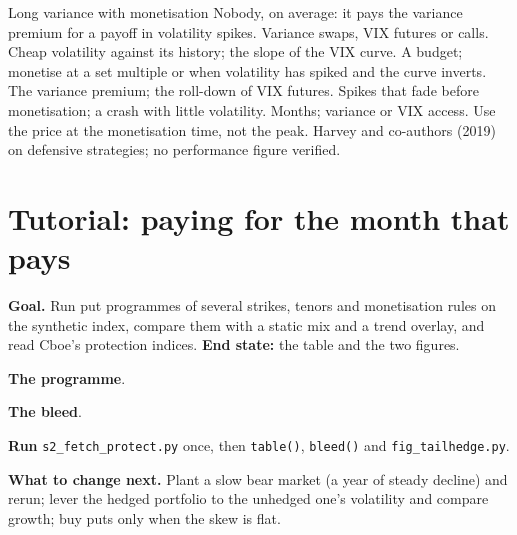 \begin{strategyfile}{Long variance with monetisation}\label{strat:s2:tail-hedging-and-long-volatility:variance}
 Nobody, on average: it pays the variance premium for a payoff in volatility spikes.
 Variance swaps, VIX futures or calls.
 Cheap volatility against its history; the slope of the VIX curve.
 A budget; monetise at a set multiple or when volatility has spiked and the curve inverts.
 The variance premium; the roll-down of VIX futures.
 Spikes that fade before monetisation; a crash with little volatility.
 Months; variance or VIX access.
 Use the price at the monetisation time, not the peak.
 Harvey and co-authors (2019) on defensive strategies; no performance figure verified.
\end{strategyfile}

\section{Tutorial: paying for the month that pays}\label{tut:s2:tail-hedging-and-long-volatility:tut}

\begin{tutorial}
\textbf{Goal.} Run put programmes of several strikes, tenors and monetisation rules on the synthetic index, compare them with a static mix and a trend
overlay, and read Cboe's protection indices. \textbf{End state:} the table and the two figures.
\begin{tutsteps}
\item \textbf{The programme}.
\label{lst:s2:tail-hedging-and-long-volatility:programme}
\item \textbf{The bleed}.
\label{lst:s2:tail-hedging-and-long-volatility:bleed}
\item \textbf{Run} \texttt{s2\_fetch\_protect.py} once, then \texttt{table()}, \texttt{bleed()} and \texttt{fig\_tailhedge.py}.
\end{tutsteps}
\textbf{What to change next.} Plant a slow bear market (a year of steady decline) and rerun; lever the hedged portfolio to the unhedged one's
volatility and compare growth; buy puts only when the skew is flat.
\end{tutorial}

